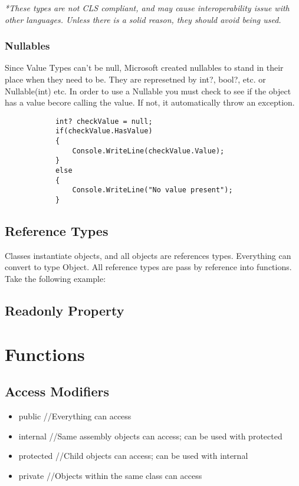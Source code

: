 \documentclass {amsart}
\begin{document}
		\emph{*These types are not CLS compliant, and may cause interoperability issue with other languages.  Unless there is a solid reason, they should avoid being used.} 


		\subsubsection{Nullables} Since Value Types can't be null, Microsoft created nullables to stand in their place when they need to be.  They are represetned by int?, bool?, etc. or Nullable(int) etc.  In order to use a Nullable you must check to see if the object has a value becore calling the value.  If not, it automatically throw an exception.

		\begin{lstlisting}
			int? checkValue = null;
			if(checkValue.HasValue)
			{
				Console.WriteLine(checkValue.Value);
			}
			else
			{
				Console.WriteLine("No value present");
			}
		\end{lstlisting}

	\subsection{Reference Types}  Classes instantiate objects, and all objects are references types.  Everything can convert to type Object.  All reference types are pass by reference into functions.  Take the following example: 

	\subsection{Readonly Property}

\section{Functions}
	\subsection{Access Modifiers}
		\begin{itemize}
			\item public 		//Everything can access
			\item internal 	//Same assembly objects can access; can be used with protected
			\item protected	//Child objects can access; can be used with internal
			\item private		//Objects within the same class can access
		\end{itemize}
\end{document}
